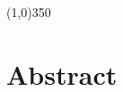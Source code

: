 \tableofcontents
\vspace{2cm}

\begin{center}
\line(1,0){350}
\end{center}

\newpage

\section*{Abstract}
